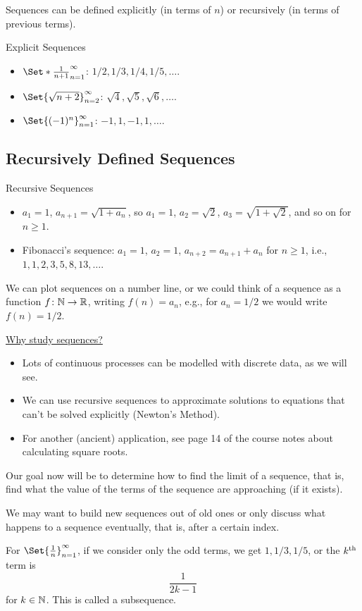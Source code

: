 Sequences can be defined explicitly (in terms of $ n $) or recursively (in terms of previous terms).
\begin{Example}{Explicit Sequences}{}
    \begin{itemize}
        \item $ \Set*{\frac{1}{n+1}}_{n=1}^{\infty} $: $ 1/2,1/3,1/4,1/5,\ldots $.
        \item $ \Set{\sqrt{n+2}}_{n=2}^{\infty} $: $ \sqrt{4},\sqrt{5},\sqrt{6},\ldots $.
        \item $ \Set{(-1)^n}_{n=1}^\infty $: $ -1,1,-1,1,\ldots $.
    \end{itemize}
\end{Example}
\subsection{Recursively Defined Sequences}
\begin{Example}{Recursive Sequences}{}
    \begin{itemize}
        \item $ a_1=1 $, $ a_{n+1}=\sqrt{1+a_n} $, so $ a_1=1 $, $ a_2=\sqrt{2} $, $ a_3=\sqrt{1+\sqrt{2}} $, and so on for $ n\ge 1 $.
        \item Fibonacci's sequence: $ a_1=1 $, $ a_2=1 $, $ a_{n+2}=a_{n+1}+a_n $ for $ n\ge 1 $, i.e.,
              $ 1,1,2,3,5,8,13,\ldots $.
    \end{itemize}
\end{Example}
We can plot sequences on a number line, or we could think of a sequence as a function $ f\colon \mathbb{N}\to\mathbb{R} $, writing $ f(n)=a_n $, e.g.,
for $ a_n=1/2 $ we would write $ f(n)=1/2 $.

\underline{Why study sequences?}
\begin{itemize}
    \item Lots of continuous processes can be modelled with discrete data, as we will see.
    \item We can use recursive sequences to approximate solutions to equations that can't be solved explicitly (Newton's Method).
    \item For another (ancient) application, see page 14 of the course notes about calculating square roots.
\end{itemize}
Our goal now will be to determine how to find the limit of a sequence, that is, find what the value of the terms of the sequence
are approaching (if it exists).

We may want to build new sequences out of old ones or only discuss what happens to a sequence eventually, that is, after a certain index.
\begin{Example}{}{}
    For $ \Set{\frac{1}{n}}_{n=1}^{\infty} $, if we consider only the odd terms, we get $ 1,1/3,1/5 $, or the $ k\textsuperscript{th} $
    term is
    \[ \frac{1}{2k-1} \]
    for $ k\in\mathbb{N} $.
    This is called a subsequence.
\end{Example}
